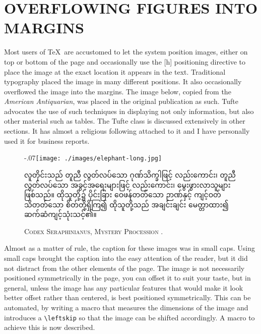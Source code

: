 \chapter[Overflowing Figures into Margins]{OVERFLOWING FIGURES INTO MARGINS}

Most users of \TeX\ are accustomed to let the system position images, either on top or bottom of the page and occasionally use the [h] positioning directive to place the image at the exact location it appears in the text. Traditional typography placed the image in many different positions. It also occasionally overflowed the image into the margins. The image below, copied from the \textit{American Antiquarian}, was placed in the original publication as such. Tufte advocates the use of such techniques in displaying not only information, but also other material such as tables. The Tufte class is discussed extensively in other sections. It has almost a religious following attached to it and I have personally used it for business reports.\citep{seraphini}

\begin{figure}[htbp]
\leftskip-.07\textwidth\texttt{[image: ./images/elephant-long.jpg]}\par

\begin{multicols}{4}
\myanmar

လူတိုင်းသည် တူညီ လွတ်လပ်သော ဂုဏ်သိက္ခါဖြင့် လည်းကောင်း၊ တူညီလွတ်လပ်သော အခွင့်အရေးများဖြင့် လည်းကောင်း၊ မွေးဖွားလာသူများ ဖြစ်သည်။ ထိုသူတို့၌ ပိုင်းခြား ဝေဖန်တတ်သော ဉာဏ်နှင့် ကျင့်ဝတ် သိတတ်သော စိတ်တို့ရှိကြ၍ ထိုသူတို့သည် အချင်းချင်း မေတ္တာထား၍ ဆက်ဆံကျင့်သုံးသင့်၏။
\end{multicols}
\centerline{\protect\textsc{Codex Seraphinianus, Mystery Procession \protect\citep{seraphini}}.}
\end{figure}

Almost as a matter of rule, the caption for these images was in small caps. Using small caps brought the caption into the easy attention of the reader, but it did not distract from the other elements of the page.
The image is not necessarily positioned symmetrically in the page, you can offset it to suit your taste, but in general, unless the image has any particular features that would make it look better offset rather than centered, is best positioned symmetrically. This can be automated, by writing a macro that measures the dimensions of the image and introduces a \verb+\leftskip+ so that the image can be shifted accordingly. A macro to achieve this is now described.


